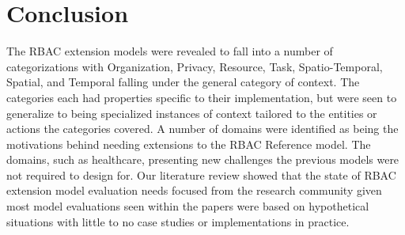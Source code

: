 \section{Conclusion} \label{sec:conclusion}

The RBAC extension models were revealed to fall into a number of categorizations with Organization, Privacy, Resource, Task, Spatio-Temporal, Spatial, and Temporal falling under the general category of context.
The categories each had properties specific to their implementation, but were seen to generalize to being specialized instances of context tailored to the entities or actions the categories covered.
A number of domains were identified as being the motivations behind needing extensions to the RBAC Reference model.  The domains, such as healthcare, presenting new challenges the previous models were not
required to design for.  Our literature review showed that the state of RBAC extension model evaluation needs focused from the research community given most model evaluations seen within the papers were
based on hypothetical situations with little to no case studies or implementations in practice.
